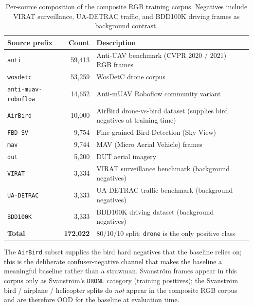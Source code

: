 \documentclass[12pt,a4paper,oneside,openright]{book}
\begin{document}
\begin{table}[htbp]
    \centering
    \caption{Per-source composition of the composite RGB training corpus. Negatives include VIRAT surveillance, UA-DETRAC traffic, and BDD100K driving frames as background contrast.}
    \label{tab:ds_rgb_components}
    \begin{tabular}{lrp{7.2cm}}
        \toprule
        Source prefix & Count & Description \\
        \midrule
        \texttt{anti}                 & 59{,}413 & Anti-UAV benchmark (CVPR 2020 / 2021)~\cite{jiang2021antiuav} RGB frames \\
        \texttt{wosdetc}              & 53{,}259 & WosDetC drone corpus \\
        \texttt{anti-muav-roboflow}   & 14{,}652 & Anti-mUAV Roboflow community variant \\
        \texttt{AirBird}              & 10{,}000 & AirBird drone-vs-bird dataset (supplies bird negatives at training time) \\
        \texttt{FBD-SV}               &  9{,}754 & Fine-grained Bird Detection (Sky View) \\
        \texttt{mav}                  &  9{,}744 & MAV (Micro Aerial Vehicle) frames \\
        \texttt{dut}                  &  5{,}200 & DUT aerial imagery \\
        \texttt{VIRAT}                &  3{,}334 & VIRAT surveillance benchmark (background negatives) \\
        \texttt{UA-DETRAC}            &  3{,}333 & UA-DETRAC traffic benchmark (background negatives) \\
        \texttt{BDD100K}              &  3{,}333 & BDD100K driving dataset (background negatives) \\
        \midrule
        \textbf{Total}                & \textbf{172{,}022} & 80/10/10 split; \texttt{drone} is the only positive class \\
        \bottomrule
    \end{tabular}
\end{table}

The \texttt{AirBird} subset supplies the bird hard negatives that the baseline relies on; this is the deliberate confuser-negative channel that makes the baseline a meaningful baseline rather than a strawman. Svanstr\"om frames appear in this corpus only as Svanstr\"om's \texttt{DRONE} category (training positives); the Svanstr\"om bird / airplane / helicopter splits do \emph{not} appear in the composite RGB corpus and are therefore OOD for the baseline at evaluation time.
\end{document}
